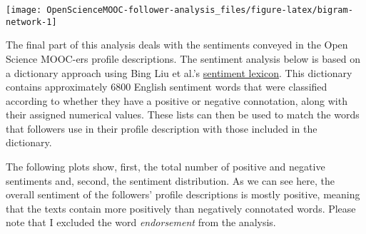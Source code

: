 \documentclass[]{article}
\begin{document}
\begin{center}\texttt{[image: OpenScienceMOOC-follower-analysis\_files/figure-latex/bigram-network-1]} \end{center}

The final part of this analysis deals with the sentiments conveyed in
the Open Science MOOC-ers profile descriptions. The sentiment analysis
below is based on a dictionary approach using Bing Liu et al.'s
\href{https://www.cs.uic.edu/~liub/FBS/sentiment-analysis.html}{sentiment
lexicon}. This dictionary contains approximately 6800 English sentiment
words that were classified according to whether they have a positive or
negative connotation, along with their assigned numerical values. These
lists can then be used to match the words that followers use in their
profile description with those included in the dictionary.

The following plots show, first, the total number of positive and
negative sentiments and, second, the sentiment distribution. As we can
see here, the overall sentiment of the followers' profile descriptions
is mostly positive, meaning that the texts contain more positively than
negatively connotated words. Please note that I excluded the word
\emph{endorsement} from the analysis.
\end{document}
